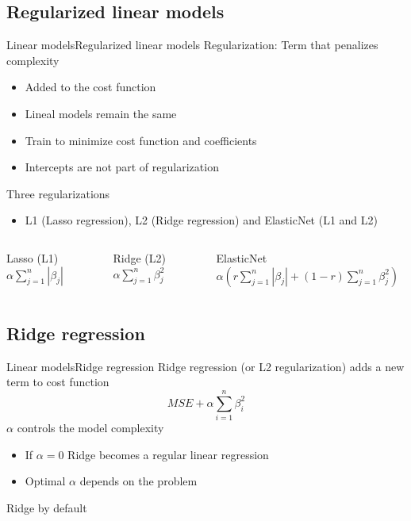 \documentclass[10pt,compress]{beamer} %
\begin{document}
\subsection{Regularized linear models}
\begin{frame}{Linear models}{Regularized linear models}
	\alert{Regularization}: Term that penalizes complexity
	\begin{itemize}
		\item Added to the cost function
        \item Lineal models remain the same
        \item Train to minimize cost function and coefficients
        \item Intercepts are not part of regularization
	\end{itemize}

    Three regularizations
	\begin{itemize}
		\item L1 (Lasso regression),  L2 (Ridge regression) and ElasticNet (L1 and L2)
	\end{itemize}

    \begin{columns}
    		\begin{block}{Lasso (L1)}
            	$\alpha \sum_{j=1}^n |\beta_j|$
        	\end{block}

     		\begin{block}{Ridge (L2)}
            	$\alpha \sum_{j=1}^n \beta_j^2$
        	\end{block}

     		\begin{block}{ElasticNet}
			   $\alpha \left( r \sum_{j=1}^n |\beta_j| + (1-r) \sum_{j=1}^n \beta_j^2 \right)$
        	\end{block}
    \end{columns}
\end{frame}

\subsection{Ridge regression}
\begin{frame}{Linear models}{Ridge regression}
	Ridge regression (or L2 regularization) adds a new term to cost function
    \begin{equation*}
        MSE + \alpha \sum_{i=1}^n \beta_i^2
    \end{equation*}
    $\alpha$ controls the model complexity
	\begin{itemize}
		\item If $\alpha = 0$ Ridge becomes a regular linear regression
        \item Optimal $\alpha$ depends on the problem
	\end{itemize}
    Ridge by default
\end{frame}
\end{document}
